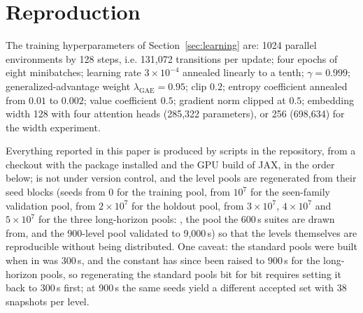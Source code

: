 
\section{Reproduction}
\label{app:repro}

The training hyperparameters of Section~\ref{sec:learning} are: 1024
parallel environments by 128 steps, i.e. 131,072 transitions per update;
four epochs of eight minibatches; learning rate $3 \times 10^{-4}$ annealed
linearly to a tenth; $\gamma = 0.999$; generalized-advantage weight
$\lambda_{\mathrm{GAE}} = 0.95$; clip $0.2$; entropy coefficient annealed
from $0.01$ to $0.002$; value coefficient $0.5$; gradient norm clipped at
$0.5$; embedding width 128 with four attention heads (285,322 parameters),
or 256 (698,634) for the width experiment.

Everything reported in this paper is produced by scripts in the repository,
from a checkout with the  package installed and the GPU build
of JAX, in the order below;  is not under version control, and the
level pools are regenerated from their seed blocks (seeds from 0 for the
training pool, from $10^7$ for the seen-family validation pool, from
$2 \times 10^7$ for the holdout pool, from $3 \times 10^7$, $4 \times 10^7$
and $5 \times 10^7$ for the three long-horizon pools: , the
 pool the 600\,s suites are drawn from, and the 900-level pool
validated to 9{,}000\,s) so that the levels themselves
are reproducible without being distributed. One caveat: the standard pools were built
when  in  was 300\,s, and
the constant has since been raised to 900\,s for the long-horizon pools, so
regenerating the standard pools bit for bit requires setting it back to
300\,s first; at 900\,s the same seeds yield a different accepted set with
38 snapshots per level.

